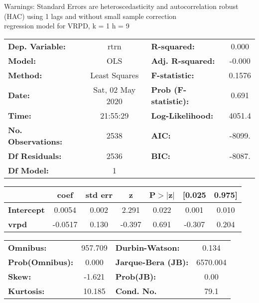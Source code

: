 Warnings: \newline
 [1] Standard Errors are heteroscedasticity and autocorrelation robust (HAC) using 1 lags and without small sample correction\\ 

regression model for VRPD, k = 1 h = 9\begin{center}
\begin{tabular}{lclc}
\toprule
\textbf{Dep. Variable:}    &       rtrn       & \textbf{  R-squared:         } &     0.000   \\
\textbf{Model:}            &       OLS        & \textbf{  Adj. R-squared:    } &    -0.000   \\
\textbf{Method:}           &  Least Squares   & \textbf{  F-statistic:       } &    0.1576   \\
\textbf{Date:}             & Sat, 02 May 2020 & \textbf{  Prob (F-statistic):} &    0.691    \\
\textbf{Time:}             &     21:55:29     & \textbf{  Log-Likelihood:    } &    4051.4   \\
\textbf{No. Observations:} &        2538      & \textbf{  AIC:               } &    -8099.   \\
\textbf{Df Residuals:}     &        2536      & \textbf{  BIC:               } &    -8087.   \\
\textbf{Df Model:}         &           1      & \textbf{                     } &             \\
\bottomrule
\end{tabular}
\begin{tabular}{lcccccc}
                   & \textbf{coef} & \textbf{std err} & \textbf{z} & \textbf{P$> |$z$|$} & \textbf{[0.025} & \textbf{0.975]}  \\
\midrule
\textbf{Intercept} &       0.0054  &        0.002     &     2.291  &         0.022        &        0.001    &        0.010     \\
\textbf{vrpd}      &      -0.0517  &        0.130     &    -0.397  &         0.691        &       -0.307    &        0.204     \\
\bottomrule
\end{tabular}
\begin{tabular}{lclc}
\textbf{Omnibus:}       & 957.709 & \textbf{  Durbin-Watson:     } &    0.134  \\
\textbf{Prob(Omnibus):} &   0.000 & \textbf{  Jarque-Bera (JB):  } & 6570.004  \\
\textbf{Skew:}          &  -1.621 & \textbf{  Prob(JB):          } &     0.00  \\
\textbf{Kurtosis:}      &  10.185 & \textbf{  Cond. No.          } &     79.1  \\
\bottomrule
\end{tabular}
\end{center}

